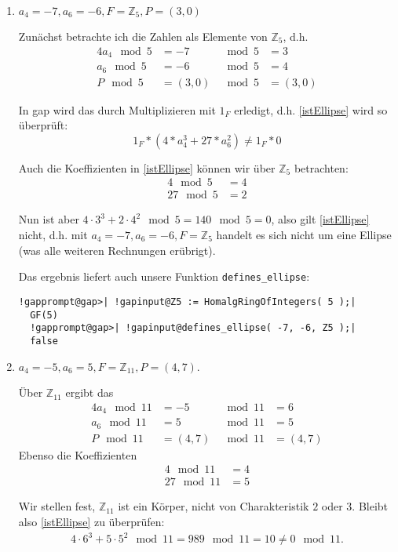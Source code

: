 \begin{enumerate}[label=\alph*)]
\item $a_{4} = -7, a_{6} = -6, F = \mathbb{Z}_{5}, P = (3, 0)$

Zunächst betrachte ich die Zahlen als Elemente von $\mathbb{Z}_{5}$, d.h.
\begin{alignat*}{4}
a_{4} \mod 5 &= -7 &\mod 5 &= 3 \\
a_{6} \mod 5 &= -6 &\mod 5 &= 4 \\
P \mod 5 &= (3, 0) &\mod 5 &= (3, 0)
\end{alignat*}

In gap wird das durch Multiplizieren mit $1_{F}$ erledigt, d.h. \eqref{istEllipse} wird so überprüft:
\[
1_{F}*(4*a_{4}^{3} + 27*a_{6}^{2}) \neq 1_{F}*0
\]

Auch die Koeffizienten in \eqref{istEllipse} können wir über $\mathbb{Z}_{5}$ betrachten:
\begin{align*}
4 \mod 5 &= 4 \\
27 \mod 5 &= 2
\end{align*}

Nun ist aber $4\cdot3^{3} + 2\cdot4^{2} \mod 5 = 140 \mod 5 = 0$, also gilt \eqref{istEllipse} nicht, d.h. mit
$a_{4} = -7, a_{6} = -6, F = \mathbb{Z}_{5}$ handelt es sich nicht um eine Ellipse (was alle weiteren Rechnungen erübrigt).

Das ergebnis liefert auch unsere Funktion \texttt{defines\_ellipse}:
\begin{Verbatim}[commandchars=!@|,fontsize=\small,frame=single,label=Example]
  !gapprompt@gap>| !gapinput@Z5 := HomalgRingOfIntegers( 5 );|
  GF(5)
  !gapprompt@gap>| !gapinput@defines_ellipse( -7, -6, Z5 );|
  false
\end{Verbatim}

\item $a_{4} = -5, a_{6} = 5, F = \mathbb{Z}_{11}, P = (4, 7)$.

Über $\mathbb{Z}_{11}$ ergibt das
\begin{alignat*}{4}
a_{4} \mod 11 &= -5 &\mod 11 &= 6 \\
a_{6} \mod 11 &= 5 &\mod 11 &= 5 \\
P \mod 11 &= (4, 7) &\mod 11 &= (4, 7)
\end{alignat*}
Ebenso die Koeffizienten
\begin{align*}
4 \mod 11 &= 4 \\
27 \mod 11 &= 5
\end{align*}

Wir stellen fest, $\mathbb{Z}_{11}$ ist ein Körper, nicht von Charakteristik $2$ oder $3$. Bleibt also \eqref{istEllipse} zu überprüfen:
\begin{align*}
4\cdot 6^{3} + 5\cdot 5^{2} \mod 11 = 989 \mod 11 = 10 \neq 0 \mod 11.
\end{align*}


\end{enumerate}
